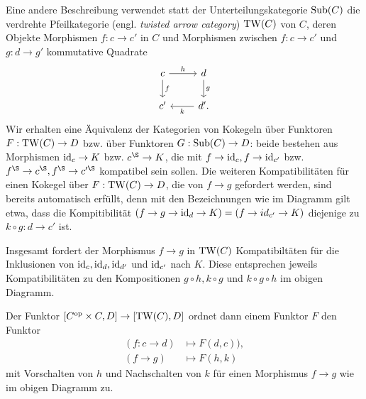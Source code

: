 \begin{bem}
  Eine andere Beschreibung verwendet statt der Unterteilungskategorie
  $\operatorname{Sub}(C)$ die verdrehte Pfeilkategorie (engl. \emph{twisted arrow
    category}) $\operatorname{TW}(C)$ von $C$, deren Objekte Morphismen $f: c \to
  c'$ in $C$ und Morphismen zwischen $f: c \to c'$ und $g: d \to g'$
  kommutative Quadrate
  \[ \begin{tikzcd}
    c \arrow{d}{f} \arrow{r}{h} & d \arrow{d}{g} \\
    c' & \arrow{l}{k} d'.
  \end{tikzcd} \]
  Wir erhalten eine Äquivalenz der Kategorien von Kokegeln über
  Funktoren $F: \operatorname{TW}(C) \to D$ bzw. über Funktoren $G: \operatorname{Sub}(C) \to D$:
  beide bestehen aus Morphismen $\operatorname{id}_c \to K$ bzw. $c^\S \to K$, die
  mit $f \to \operatorname{id}_c, f \to \operatorname{id}_{c'}$ bzw. $f^\S \to c^\S, f^\S \to
  c'^\S$ kompatibel sein sollen. Die weiteren Kompatibilitäten für
  einen Kokegel über $F: \operatorname{TW}(C) \to D$, die von $f \to g$ gefordert
  werden, sind bereits automatisch erfüllt, denn mit den Bezeichnungen
  wie im Diagramm gilt etwa, dass die Kompitibilität $(f \to g \to
  \operatorname{id}_d \to K) = (f \to id_{c'} \to K)$ diejenige zu $k \circ g: d \to
  c'$ ist.

  Insgesamt fordert der Morphismus $f \to g$ in $\operatorname{TW}(C)$
  Kompatibiltäten für die Inklusionen von $\operatorname{id}_c, \operatorname{id}_d, \operatorname{id}_{d'}$ und
  $\operatorname{id}_{c'}$ nach $K$. Diese entsprechen jeweils Kompatibilitäten zu
  den Kompositionen $g \circ h, k \circ g$ und $k \circ g \circ h$ im
  obigen Diagramm.

  Der Funktor $[C^\mathrm{op} \times C, D] \to [\operatorname{TW}(C), D]$ ordnet dann einem
  Funktor $F$ den Funktor
  \begin{align*}
    (f: c \to d) &\mapsto F(d, c)), \\
    (f \to g) &\mapsto F(h, k)
  \end{align*}
  mit Vorschalten von $h$ und Nachschalten von $k$ für einen
  Morphismus $f \to g$ wie im obigen Diagramm zu.
\end{bem}

